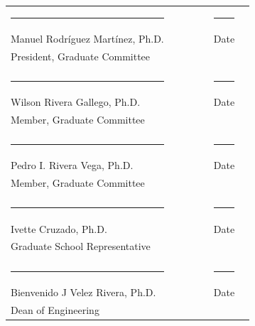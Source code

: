\documentclass[12pt]{report}
\begin{document}
\begin{titlepage}
\begin{tabular}{l c c c c c r}
			\rule{2.5in}{.1pt} & & & &  &\rule{2in}{.1pt}\\
			Manuel Rodr\'iguez Mart\'inez, Ph.D. & & & &  &Date\\
			President, Graduate Committee\\
			\vspace{.3cm}\\
			\rule{2.5in}{.1pt}& & & &  &\rule{2in}{.1pt}\\
			Wilson Rivera Gallego, Ph.D. & & & &  &Date\\
			Member, Graduate Committee\\
			\vspace{.3cm}\\
			\rule{2.5in}{.1pt} & & & &  &\rule{2in}{.1pt}\\
			Pedro I. Rivera Vega, Ph.D. & & & &  &Date\\
			Member, Graduate Committee\\
			\vspace{.45cm}\\
			\rule{2.5in}{.1pt} & & & &  &\rule{2in}{.1pt}\\
			Ivette Cruzado, Ph.D. & & & &  &Date\\
			Graduate School Representative\\
			\vspace{.45cm}\\
			\rule{2.5in}{.1pt} & & & &  &\rule{2in}{.1pt}\\
			Bienvenido J Velez Rivera, Ph.D. & & & &  &Date\\
			Dean of Engineering \\
		\end{tabular}
	\end{titlepage}
	
	\setcounter{page}{2}
	
\end{document}
